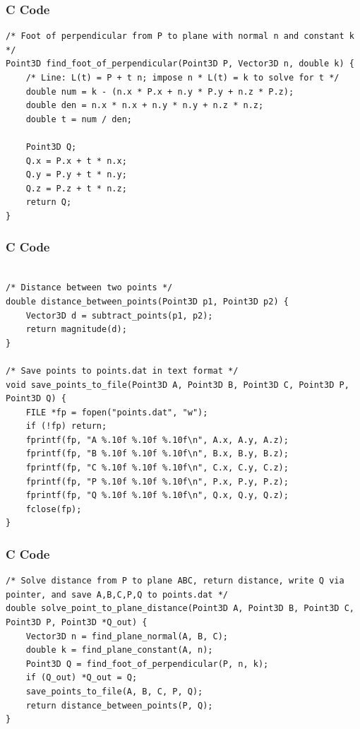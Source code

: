 \documentclass{beamer}
\begin{document}
\begin{frame}[fragile]
    \frametitle{C Code}
    \begin{lstlisting}
/* Foot of perpendicular from P to plane with normal n and constant k */
Point3D find_foot_of_perpendicular(Point3D P, Vector3D n, double k) {
    /* Line: L(t) = P + t n; impose n * L(t) = k to solve for t */
    double num = k - (n.x * P.x + n.y * P.y + n.z * P.z);
    double den = n.x * n.x + n.y * n.y + n.z * n.z;
    double t = num / den;

    Point3D Q;
    Q.x = P.x + t * n.x;
    Q.y = P.y + t * n.y;
    Q.z = P.z + t * n.z;
    return Q;
}

    \end{lstlisting}
\end{frame}

\begin{frame}[fragile]
    \frametitle{C Code}
    \begin{lstlisting}

/* Distance between two points */
double distance_between_points(Point3D p1, Point3D p2) {
    Vector3D d = subtract_points(p1, p2);
    return magnitude(d);
}

/* Save points to points.dat in text format */
void save_points_to_file(Point3D A, Point3D B, Point3D C, Point3D P, Point3D Q) {
    FILE *fp = fopen("points.dat", "w");
    if (!fp) return;
    fprintf(fp, "A %.10f %.10f %.10f\n", A.x, A.y, A.z);
    fprintf(fp, "B %.10f %.10f %.10f\n", B.x, B.y, B.z);
    fprintf(fp, "C %.10f %.10f %.10f\n", C.x, C.y, C.z);
    fprintf(fp, "P %.10f %.10f %.10f\n", P.x, P.y, P.z);
    fprintf(fp, "Q %.10f %.10f %.10f\n", Q.x, Q.y, Q.z);
    fclose(fp);
}
    \end{lstlisting}
\end{frame}

\begin{frame}[fragile]
    \frametitle{C Code}
    \begin{lstlisting}
/* Solve distance from P to plane ABC, return distance, write Q via pointer, and save A,B,C,P,Q to points.dat */
double solve_point_to_plane_distance(Point3D A, Point3D B, Point3D C, Point3D P, Point3D *Q_out) {
    Vector3D n = find_plane_normal(A, B, C);
    double k = find_plane_constant(A, n);
    Point3D Q = find_foot_of_perpendicular(P, n, k);
    if (Q_out) *Q_out = Q;
    save_points_to_file(A, B, C, P, Q);
    return distance_between_points(P, Q);
}
    \end{lstlisting}
\end{frame}
\end{document}
